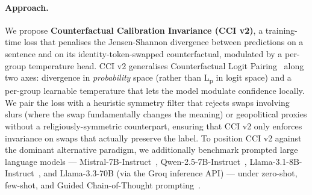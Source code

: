 \documentclass[10pt,a4paper]{article}
\begin{document}
\paragraph{Approach.}
We propose \textbf{Counterfactual Calibration Invariance (CCI v2)}, a training-time loss that penalises the Jensen-Shannon divergence between predictions on a sentence and on its identity-token-swapped counterfactual, modulated by a per-group temperature head. CCI v2 generalises Counterfactual Logit Pairing~\citep{garg2019counterfactual,davani2021improving} along two axes: divergence in \emph{probability} space (rather than L\textsubscript{p} in logit space) and a per-group learnable temperature that lets the model modulate confidence locally. We pair the loss with a heuristic symmetry filter that rejects swaps involving slurs (where the swap fundamentally changes the meaning) or geopolitical proxies without a religiously-symmetric counterpart, ensuring that CCI v2 only enforces invariance on swaps that actually preserve the label. To position CCI v2 against the dominant alternative paradigm, we additionally benchmark prompted large language models --- Mistral-7B-Instruct~\citep{jiang2023mistral}, Qwen-2.5-7B-Instruct~\citep{qwen25}, Llama-3.1-8B-Instruct~\citep{llama31}, and Llama-3.3-70B (via the Groq inference API) --- under zero-shot, few-shot, and Guided Chain-of-Thought prompting~\citep{patel2025evaluating}.
\end{document}
